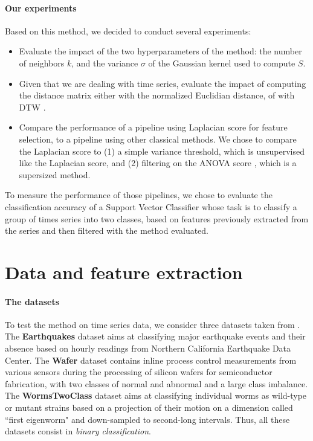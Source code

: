 \documentclass[11pt]{article}
\begin{document}
\paragraph{Our experiments} Based on this method, we decided to conduct several experiments:

\begin{itemize}
    \item Evaluate the impact of the two hyperparameters of the method: the number of neighbors $k$, and the variance $\sigma$ of the Gaussian kernel used to compute $S$.
    \item Given that we are dealing with time series, evaluate the impact of computing the distance matrix either with the normalized Euclidian distance, of with DTW  \cite{giorgino_computing_2009}.
    \item Compare the performance of a pipeline using Laplacian score for feature selection, to a pipeline using other classical methods. We chose to compare the Laplacian score to (1) a simple variance threshold, which is unsupervised like the Laplacian score, and (2) filtering on the ANOVA score \cite{scheffe_analysis_1999}, which is a supersized method.
\end{itemize}

To measure the performance of those pipelines, we chose to evaluate the classification accuracy of a Support Vector Classifier whose task is to classify a group of times series into two classes, based on features previously extracted from the series and then filtered with the method evaluated.

\newpage
\section{Data and feature extraction}

\paragraph{The datasets} To test the method on time series data, we consider three datasets taken from \cite{bagnall_time_nodate}. The \textbf{Earthquakes} dataset  \cite{bagnall_earthquakes_nodate} aims at classifying major earthquake events and their absence based on hourly readings from Northern California Earthquake Data Center. The \textbf{Wafer} dataset \cite{olszewski_wafer_nodate} contains inline process control measurements from various sensors during the processing of silicon wafers for semiconductor fabrication, with two classes of normal and abnormal and a large class imbalance. The \textbf{WormsTwoClass} dataset \cite{brown_wormtwoclass_nodate} aims at classifying individual worms as wild-type or mutant strains based on a projection of their motion on a dimension called ``first eigenworm" and down-sampled to second-long intervals. Thus, all these datasets consist in \emph{binary classification}.
\end{document}
